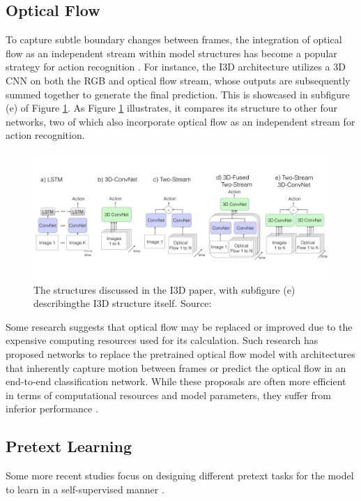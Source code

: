 \subsection{Optical Flow}
To capture subtle boundary changes between frames, the integration of optical flow as an independent stream within model structures has become a popular strategy for action recognition \parencite{sevilla2019integration, tran2015learning, carreira2017quo}. For instance, the I3D architecture \parencite{carreira2017quo} utilizes a 3D CNN on both the RGB and optical flow stream, whose outputs are subsequently summed together to generate the final prediction. This is showcased in subfigure (e) of Figure \ref{fig:structuresi3d}. As Figure \ref{fig:structuresi3d} illustrates, it compares its structure to other four networks, two of which also incorporate optical flow as an independent stream for action recognition.

\begin{figure}[ht]
    \centering
    \includegraphics[width=1.0\textwidth]{assets/charts_rw/I3D}
    \caption[Illustration of Structures Discussed in I3D]{The structures discussed in the I3D paper, with subfigure (e) describingthe I3D structure itself. Source: \parencite{carreira2017quo}}
    \label{fig:structuresi3d}
\end{figure}

Some research suggests that optical flow may be replaced or improved due to the expensive computing resources used for its calculation. Such research has proposed networks to replace the pretrained optical flow model with architectures that inherently capture motion between frames or predict the optical flow in an end-to-end classification network. While these proposals are often more efficient in terms of computational resources and model parameters, they suffer from inferior performance \parencite{Lee_2018_ECCV, 8354283, Piergiovanni_2019_CVPR}.

\subsection{Pretext Learning}
Some more recent studies focus on designing different pretext tasks for the model to learn in a self-supervised manner \parencite{wang2022internvideo}.

